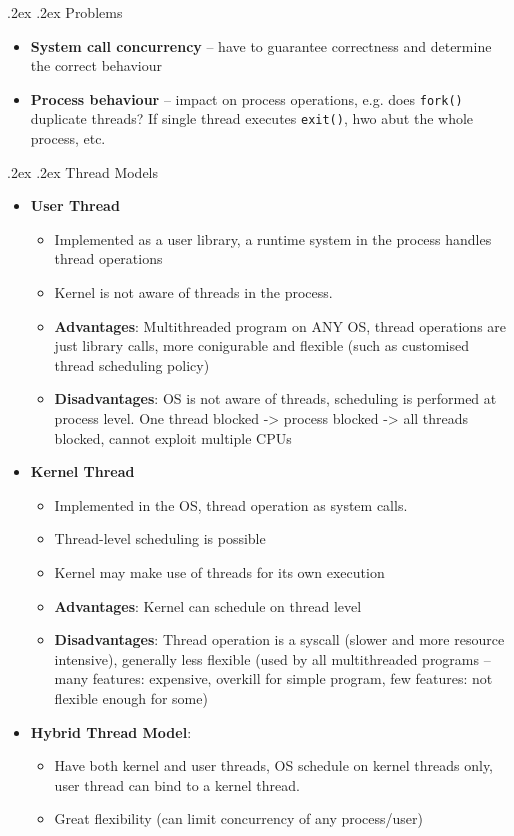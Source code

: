 \documentclass[10pt,landscape,a4paper]{article}
\makeatletter
\renewcommand{\subsection}{\@startsection{subsection}{1}{0mm}%
  {.2ex}%
  {.2ex}%
{\sffamily\bfseries}}
\makeatother
\begin{document}
\begin{multicols*}{4}
  \subsection{Problems}
  \begin{itemize}
    \item \textbf{System call concurrency} -- have to guarantee correctness and determine the correct behaviour
    \item \textbf{Process behaviour} -- impact on process operations, e.g. does \texttt{fork()} duplicate threads? If single thread executes \texttt{exit()}, hwo abut the whole process, etc.
  \end{itemize}
  \subsection{Thread Models}
  \begin{itemize}
    \item \textbf{User Thread}
    \begin{itemize}
      \item Implemented as a user library, a runtime system in the process handles thread operations
      \item Kernel is not aware of threads in the process.
      \item \textbf{Advantages}: Multithreaded program on ANY OS, thread operations are just library calls, more conigurable and flexible (such as customised thread scheduling policy)
      \item \textbf{Disadvantages}: OS is not aware of threads, scheduling is performed at process level. One thread blocked -> process blocked -> all threads blocked, cannot exploit multiple CPUs
    \end{itemize}
    \item \textbf{Kernel Thread}
    \begin{itemize}
      \item Implemented in the OS, thread operation as system calls.
      \item Thread-level scheduling is possible
      \item Kernel may make use of threads for its own execution
      \item \textbf{Advantages}: Kernel can schedule on thread level
      \item \textbf{Disadvantages}: Thread operation is a syscall (slower and more resource intensive), generally less flexible (used by all multithreaded programs -- many features: expensive, overkill for simple program, few features: not flexible enough for some)
    \end{itemize}
    \item \textbf{Hybrid Thread Model}:
    \begin{itemize}
      \item Have both kernel and user threads, OS schedule on kernel threads only, user thread can bind to a kernel thread.
      \item Great flexibility (can limit concurrency of any process/user)
    \end{itemize}
  \end{itemize}

\end{multicols*}
\end{document}
